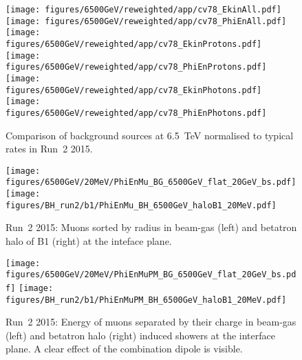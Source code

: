 \begin{figure}
\begin{center}
  \texttt{[image: figures/6500GeV/reweighted/app/cv78\_EkinAll.pdf]}
  \texttt{[image: figures/6500GeV/reweighted/app/cv78\_PhiEnAll.pdf]}
  \texttt{[image: figures/6500GeV/reweighted/app/cv78\_EkinProtons.pdf]}
  \texttt{[image: figures/6500GeV/reweighted/app/cv78\_PhiEnProtons.pdf]}
 \texttt{[image: figures/6500GeV/reweighted/app/cv78\_EkinPhotons.pdf]}
 \texttt{[image: figures/6500GeV/reweighted/app/cv78\_PhiEnPhotons.pdf]}
\end{center}
\vspace{-0.6cm}
 \caption{Comparison of background sources at 6.5~TeV normalised to typical rates in Run~2 2015.
  \label{compAllBKG_6.52}}
\end{figure}




\begin{figure}
\begin{center}
  \texttt{[image: figures/6500GeV/20MeV/PhiEnMu\_BG\_6500GeV\_flat\_20GeV\_bs.pdf]}
  \texttt{[image: figures/BH\_run2/b1/PhiEnMu\_BH\_6500GeV\_haloB1\_20MeV.pdf]}      
\end{center}
\vspace{-0.6cm}
 \caption{Run~2 2015: Muons sorted by radius in beam-gas (left) and betatron halo of B1 (right) at the inteface plane.
  \label{fig:PhiEnMu}}
\end{figure}



\begin{figure}
\begin{center}
  \texttt{[image: figures/6500GeV/20MeV/PhiEnMuPM\_BG\_6500GeV\_flat\_20GeV\_bs.pdf]}
    \texttt{[image: figures/BH\_run2/b1/PhiEnMuPM\_BH\_6500GeV\_haloB1\_20MeV.pdf]}            
\end{center}
\vspace{-0.6cm}
 \caption{Run~2 2015: Energy of muons separated by their charge in beam-gas (left) and betatron halo (right) induced showers at the interface plane. A clear effect of the combination dipole is visible. 
  \label{fig:PhiEnMuPM}}
\end{figure}


